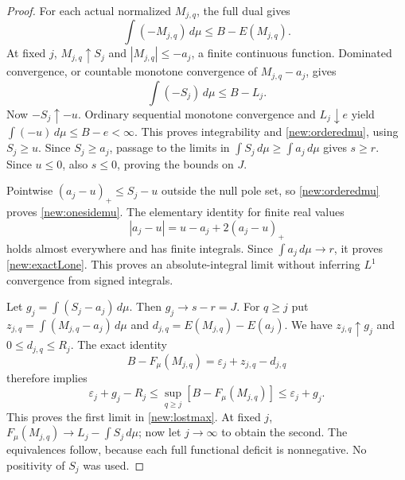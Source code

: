 \begin{proof}
For each actual normalized $M_{j,q}$, the full dual gives
\[
 \int(-M_{j,q})\,d\mu\le B-E(M_{j,q}).
\]
At fixed $j$, $M_{j,q}\uparrow S_j$ and $|M_{j,q}|\le-a_j$,
a finite continuous function. Dominated convergence, or countable
monotone convergence of $M_{j,q}-a_j$, gives
\[
 \int(-S_j)\,d\mu\le B-L_j.
\]
Now $-S_j\uparrow-u$. Ordinary sequential monotone convergence and
$L_j\downarrow e$ yield $\int(-u)\,d\mu\le B-e<\infty$.
This proves integrability and \eqref{new:orderedmu}, using
$S_j\ge u$. Since $S_j\ge a_j$, passage to the limits in
$\int S_j\,d\mu\ge\int a_j\,d\mu$ gives $s\ge r$.
Since $u\le0$, also $s\le0$, proving the bounds on $J$.

Pointwise $(a_j-u)_+\le S_j-u$ outside the null pole set, so
\eqref{new:orderedmu} proves \eqref{new:onesidemu}. The elementary
identity for finite real values
\[
 |a_j-u|=u-a_j+2(a_j-u)_+
\]
holds almost everywhere and has finite integrals. Since
$\int a_j\,d\mu\to r$, it proves \eqref{new:exactLone}.
This proves an absolute-integral limit without inferring $L^1$
convergence from signed integrals.

Let $g_j=\int(S_j-a_j)\,d\mu$. Then $g_j\to s-r=J$.
For $q\ge j$ put $z_{j,q}=\int(M_{j,q}-a_j)\,d\mu$ and
$d_{j,q}=E(M_{j,q})-E(a_j)$. We have $z_{j,q}\uparrow g_j$ and
$0\le d_{j,q}\le R_j$. The exact identity
\[
 B-F_\mu(M_{j,q})=\varepsilon_j+z_{j,q}-d_{j,q}
\]
therefore implies
\[
 \varepsilon_j+g_j-R_j
 \le\sup_{q\ge j}[B-F_\mu(M_{j,q})]
 \le\varepsilon_j+g_j.
\]
This proves the first limit in \eqref{new:lostmax}. At fixed $j$,
$F_\mu(M_{j,q})\to L_j-\int S_j\,d\mu$; now let $j\to\infty$
to obtain the second. The equivalences follow, because each full
functional deficit is nonnegative. No positivity of $S_j$ was used.
\end{proof}

